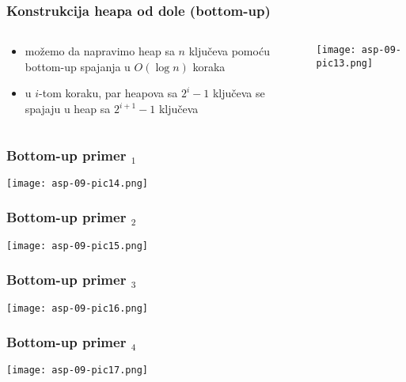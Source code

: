 \documentclass[compress]{beamer}
\begin{document}
\begin{frame}[fragile]
  \frametitle{Konstrukcija heapa od dole (bottom-up)}
  \begin{columns}
    \begin{column}[c]{6cm}
      \begin{itemize}
        \item možemo da napravimo heap sa $n$ ključeva pomoću bottom-up
        spajanja u $O(\log n)$ koraka
        \item u $i$-tom koraku, par heapova sa $2^i-1$ ključeva se spajaju u
        heap sa $2^{i+1}-1$ ključeva
        \end{itemize}
    \end{column}
    \begin{column}[c]{5cm}
      \begin{center}
        \texttt{[image: asp-09-pic13.png]}
      \end{center}
    \end{column}
  \end{columns}
\end{frame}

\begin{frame}[fragile]
  \frametitle{Bottom-up primer $_1$}
  \begin{center}
    \texttt{[image: asp-09-pic14.png]}
  \end{center}
\end{frame}

\begin{frame}[fragile]
  \frametitle{Bottom-up primer $_2$}
  \begin{center}
    \texttt{[image: asp-09-pic15.png]}
  \end{center}
\end{frame}

\begin{frame}[fragile]
  \frametitle{Bottom-up primer $_3$}
  \begin{center}
    \texttt{[image: asp-09-pic16.png]}
  \end{center}
\end{frame}

\begin{frame}[fragile]
  \frametitle{Bottom-up primer $_4$}
  \begin{center}
    \texttt{[image: asp-09-pic17.png]}
  \end{center}
\end{frame}
\end{document}
